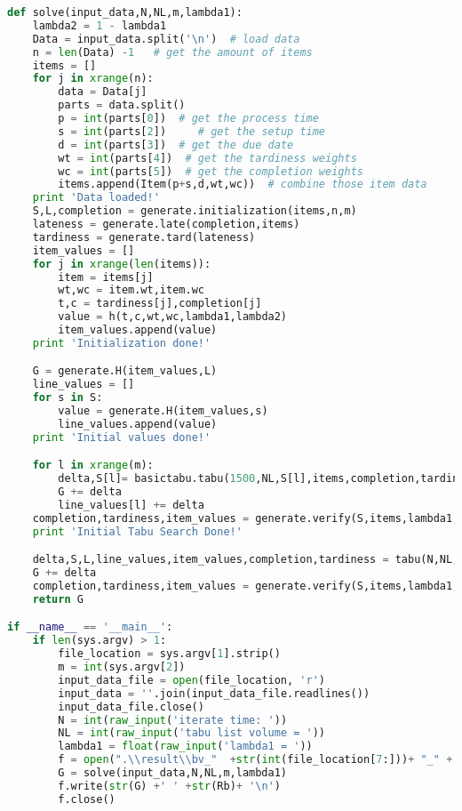 \begin{lstlisting}[language = Python]
def solve(input_data,N,NL,m,lambda1):
	lambda2 = 1 - lambda1
	Data = input_data.split('\n')  # load data
	n = len(Data) -1   # get the amount of items
	items = []
	for j in xrange(n):
		data = Data[j]
		parts = data.split()
		p = int(parts[0])  # get the process time
		s = int(parts[2])	  # get the setup time
		d = int(parts[3])  # get the due date
		wt = int(parts[4])  # get the tardiness weights
		wc = int(parts[5])  # get the completion weights
		items.append(Item(p+s,d,wt,wc))  # combine those item data
	print 'Data loaded!'	
	S,L,completion = generate.initialization(items,n,m)
	lateness = generate.late(completion,items)
	tardiness = generate.tard(lateness)
	item_values = []
	for j in xrange(len(items)):
		item = items[j]
		wt,wc = item.wt,item.wc
		t,c = tardiness[j],completion[j]
		value = h(t,c,wt,wc,lambda1,lambda2)
		item_values.append(value)
	print 'Initialization done!'

	G = generate.H(item_values,L)
	line_values = []
	for s in S:
		value = generate.H(item_values,s)
		line_values.append(value)
	print 'Initial values done!'

	for l in xrange(m):
		delta,S[l]= basictabu.tabu(1500,NL,S[l],items,completion,tardiness,lambda1,lambda2)
		G += delta
		line_values[l] += delta
	completion,tardiness,item_values = generate.verify(S,items,lambda1,lambda2)
	print 'Initial Tabu Search Done!'

	delta,S,L,line_values,item_values,completion,tardiness = tabu(N,NL,S,L,items, completion,tardiness,line_values,item_values,G,lambda1,lambda2)
	G += delta
	completion,tardiness,item_values = generate.verify(S,items,lambda1,lambda2)
	return G

if __name__ == '__main__':
	if len(sys.argv) > 1:
		file_location = sys.argv[1].strip()
		m = int(sys.argv[2])
		input_data_file = open(file_location, 'r')
		input_data = ''.join(input_data_file.readlines())
		input_data_file.close()
		N = int(raw_input('iterate time: '))
		NL = int(raw_input('tabu list volume = '))
		lambda1 = float(raw_input('lambda1 = '))
		f = open(".\\result\\bv_"  +str(int(file_location[7:]))+ "_" + str(m) + "_" + str(lambda1),'w')
		G = solve(input_data,N,NL,m,lambda1)
		f.write(str(G) +' ' +str(Rb)+ '\n')
		f.close()
\end{lstlisting}
